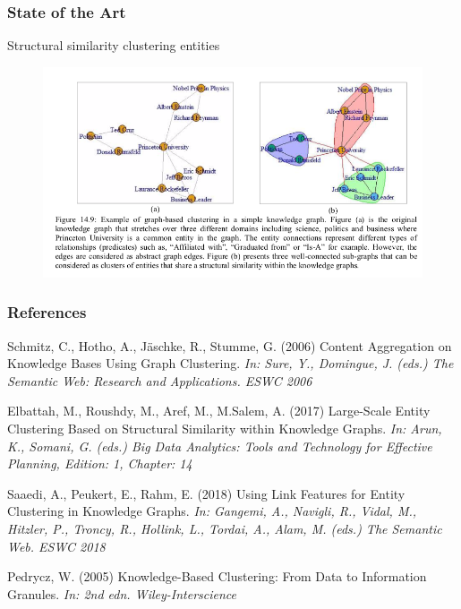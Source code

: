 \documentclass{beamer}
\begin{document}
\begin{frame}
\frametitle{State of the Art}
\begin{center}
 \Large{\textcolor{RWTHblue}{Structural similarity clustering entities}}
 \begin{figure}[h!]
  \includegraphics[width=1 \linewidth]{ex.png}
  
\end{figure}
\end{center}
\end{frame}


\begin{frame}
\frametitle{References}
\footnotesize{
\begin{thebibliography}{99} %

 Schmitz, C., Hotho, A., J{\"a}schke, R., Stumme, G. (2006) 
\newblock Content Aggregation on Knowledge Bases Using Graph Clustering.
\newblock \emph{In: Sure, Y., Domingue, J. (eds.) The Semantic Web: Research and Applications. ESWC 2006}

 Elbattah, M., Roushdy, M., Aref, M., M.Salem, A. (2017) 
\newblock Large-Scale Entity Clustering Based on Structural Similarity within Knowledge Graphs.
\newblock \emph{In: Arun, K., Somani, G. (eds.) Big Data Analytics: Tools and Technology for Effective Planning, Edition: 1, Chapter: 14}

 Saaedi, A., Peukert, E., Rahm, E.  (2018) 
\newblock Using Link Features for Entity Clustering in Knowledge Graphs.
\newblock \emph{In: Gangemi, A., Navigli, R., Vidal, M., Hitzler, P., Troncy, R., Hollink, L., Tordai, A., Alam, M. (eds.) The Semantic Web. ESWC 2018}

 Pedrycz, W.  (2005) 
\newblock Knowledge-Based Clustering: From Data to Information Granules.
\newblock \emph{In: 2nd edn. Wiley-Interscience}
\end{thebibliography}
}
\end{frame}
\end{document}
